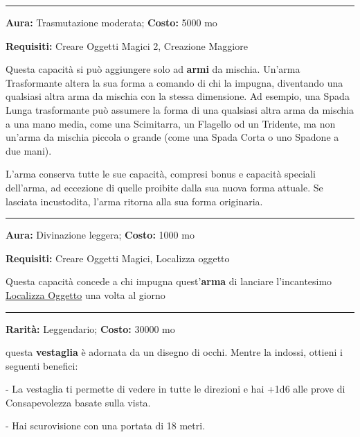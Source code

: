 \begin{multicols}{2}
\smallskip\noindent\rule{\linewidth}{2pt}  \hypertarget{Trasformante}{}\medskip{}\noindent\label{Trasformante}

\textbf{Aura:} Trasmutazione moderata; \textbf{Costo:} 5000 mo

\textbf{Requisiti:} Creare Oggetti Magici 2, Creazione Maggiore

Questa capacità si può aggiungere solo ad \textbf{armi} da mischia. Un'arma Trasformante altera la sua forma a comando di chi la impugna, diventando una qualsiasi altra arma da mischia con la stessa dimensione. Ad esempio, una Spada Lunga trasformante può assumere la forma di una qualsiasi altra arma da mischia a una mano media, come una Scimitarra, un Flagello od un Tridente, ma non un'arma da mischia piccola o grande (come una Spada Corta o uno Spadone a due mani).

L'arma conserva tutte le sue capacità, compresi bonus e capacità speciali dell'arma, ad eccezione di quelle proibite dalla sua nuova forma attuale. Se lasciata incustodita, l'arma ritorna alla sua forma originaria.

\smallskip\noindent\rule{\linewidth}{2pt}  \hypertarget{Trovacose}{}\medskip{}\noindent\label{Trovacose}

\textbf{Aura:} Divinazione leggera; \textbf{Costo:} 1000 mo

\textbf{Requisiti:} Creare Oggetti Magici, Localizza oggetto

Questa capacità concede a chi impugna quest'\textbf{arma} di lanciare l'incantesimo \hyperlink{Localizza Oggetto}{Localizza Oggetto} una volta al giorno

\smallskip\noindent\rule{\linewidth}{2pt}  \hypertarget{TunicadegliOcchi}{}\medskip{}\noindent\label{TunicadegliOcchi}

\textbf{Rarità:} Leggendario; \textbf{Costo:} 30000 mo

questa \textbf{vestaglia} è adornata da un disegno di occhi. Mentre la indossi, ottieni i seguenti benefici:

- La vestaglia ti permette di vedere in tutte le direzioni e hai +1d6 alle prove di Consapevolezza basate sulla vista.

- Hai scurovisione con una portata di 18 metri.


\end{multicols}

